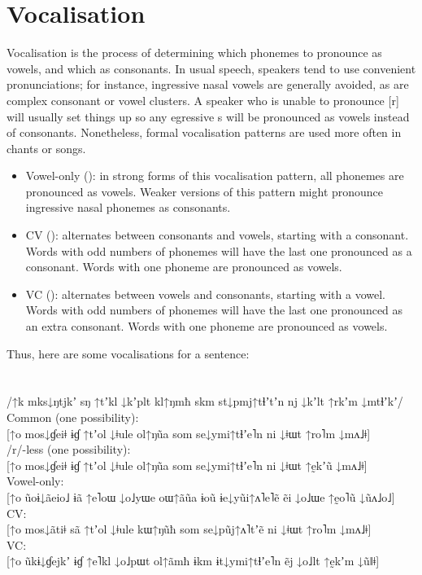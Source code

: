 \documentclass{book}
\begin{document}
\section{Vocalisation}

Vocalisation is the process of determining which phonemes to pronounce as vowels, and which as consonants. In usual speech, speakers tend to use convenient pronunciations; for instance, ingressive nasal vowels are generally avoided, as are complex consonant or vowel clusters. A speaker who is unable to pronounce [r] will usually set things up so any egressive s will be pronounced as vowels instead of consonants. Nonetheless, formal vocalisation patterns are used more often in chants or songs.

\begin{itemize}
  \item Vowel-only (): in strong forms of this vocalisation pattern, all phonemes are pronounced as vowels. Weaker versions of this pattern might pronounce ingressive nasal phonemes as consonants.
  \item CV (): alternates between consonants and vowels, starting with a consonant. Words with odd numbers of phonemes will have the last one pronounced as a consonant. Words with one phoneme are pronounced as vowels.
  \item VC (): alternates between vowels and consonants, starting with a vowel. Words with odd numbers of phonemes will have the last one pronounced as an extra consonant. Words with one phoneme are pronounced as vowels.
\end{itemize}

Thus, here are some vocalisations for a sentence: \\
~\\
 \\
/↑k mks↓ŋtjkʼ sŋ ↑tʼkl ↓kʼplt kl↑ŋmħ skm st↓pmj↑tɬʼtʼn nj ↓kʼlt ↑rkʼm ↓mtɬʼkʼ/ \\
Common (one possibility): \\
{}[↑o mos↓ɠeiǂ ɨɠ ↑tʼol ↓ǂule ol↑ŋũa som se↓ymi↑tɬʼe˥n ni ↓ǂɯt ↑ro˥m ↓mʌ˩ǂ] \\
/r/-less (one possibility): \\
{}[↑o mos↓ɠeiǂ ɨɠ ↑tʼol ↓ǂule ol↑ŋũa som se↓ymi↑tɬʼe˥n ni ↓ǂɯt ↑ḛkʼũ ↓mʌ˩ǂ] \\
Vowel-only: \\
{}[↑o ũoɨ↓ãeio˩ ɨã ↑e˥oɯ ↓o˩yɯe oɯ↑ãũa ɨoũ ɨe↓yũi↑ʌ˥e˥ẽ ẽi ↓o˩ɯe ↑ḛo˥ũ ↓ũʌ˩o˩] \\
CV: \\
{}[↑o mos↓ãtiǂ sã ↑tʼol ↓ǂule kɯ↑ŋũħ som se↓pũj↑ʌ˥tʼẽ ni ↓ǂɯt ↑ro˥m ↓mʌ˩ǂ] \\
VC: \\
{}[↑o ũkɨ↓ɠejkʼ ɨɠ ↑e˥kl ↓o˩pɯt ol↑ãmħ ɨkm ɨt↓ymi↑tɬʼe˥n ẽj ↓o˩lt ↑ḛkʼm ↓ũǁǂ]
\end{document}
